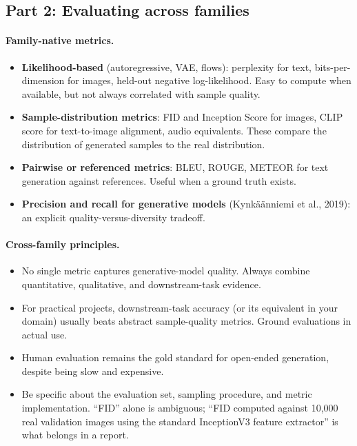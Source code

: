 \documentclass[11pt]{article}
\theoremstyle{remark}
\begin{document}
\subsection{Part 2: Evaluating across families}

\paragraph{Family-native metrics.}
\begin{itemize}[leftmargin=1.4em]
  \item \textbf{Likelihood-based} (autoregressive, VAE, flows): perplexity for text, bits-per-dimension for images, held-out negative log-likelihood. Easy to compute when available, but not always correlated with sample quality.
  \item \textbf{Sample-distribution metrics}: FID and Inception Score for images, CLIP score for text-to-image alignment, audio equivalents. These compare the distribution of generated samples to the real distribution.
  \item \textbf{Pairwise or referenced metrics}: BLEU, ROUGE, METEOR for text generation against references. Useful when a ground truth exists.
  \item \textbf{Precision and recall for generative models} (Kynk\"a\"anniemi et al., 2019): an explicit quality-versus-diversity tradeoff.
\end{itemize}

\paragraph{Cross-family principles.}
\begin{itemize}[leftmargin=1.4em]
  \item No single metric captures generative-model quality. Always combine quantitative, qualitative, and downstream-task evidence.
  \item For practical projects, downstream-task accuracy (or its equivalent in your domain) usually beats abstract sample-quality metrics. Ground evaluations in actual use.
  \item Human evaluation remains the gold standard for open-ended generation, despite being slow and expensive.
  \item Be specific about the evaluation set, sampling procedure, and metric implementation. ``FID'' alone is ambiguous; ``FID computed against 10,000 real validation images using the standard InceptionV3 feature extractor'' is what belongs in a report.
\end{itemize}
\end{document}
